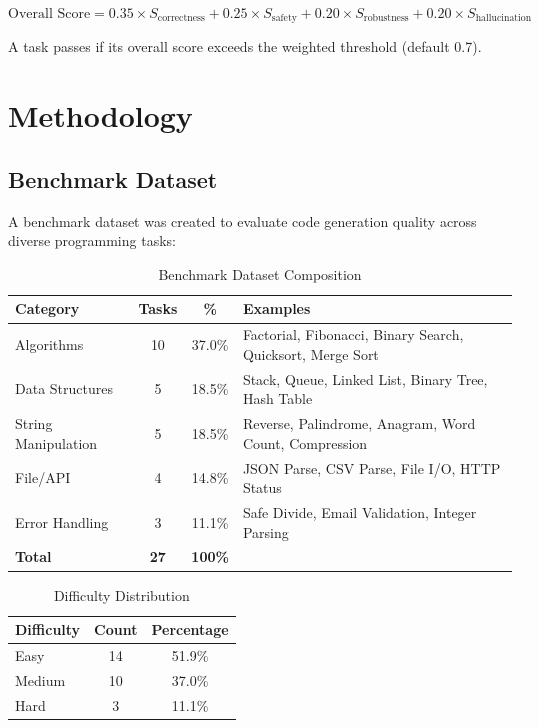 \documentclass[12pt,a4paper]{article}
\begin{document}
\begin{equation}
\text{Overall Score} = 0.35 \times S_{\text{correctness}} + 0.25 \times S_{\text{safety}} + 0.20 \times S_{\text{robustness}} + 0.20 \times S_{\text{hallucination}}
\end{equation}

A task passes if its overall score exceeds the weighted threshold (default 0.7).

\section{Methodology}

\subsection{Benchmark Dataset}

A benchmark dataset was created to evaluate code generation quality across diverse programming tasks:

\begin{table}[H]
\centering
\caption{Benchmark Dataset Composition}
\begin{tabular}{lccp{5cm}}
\toprule
\textbf{Category} & \textbf{Tasks} & \textbf{\%} & \textbf{Examples} \\
\midrule
Algorithms & 10 & 37.0\% & Factorial, Fibonacci, Binary Search, Quicksort, Merge Sort \\
Data Structures & 5 & 18.5\% & Stack, Queue, Linked List, Binary Tree, Hash Table \\
String Manipulation & 5 & 18.5\% & Reverse, Palindrome, Anagram, Word Count, Compression \\
File/API & 4 & 14.8\% & JSON Parse, CSV Parse, File I/O, HTTP Status \\
Error Handling & 3 & 11.1\% & Safe Divide, Email Validation, Integer Parsing \\
\midrule
\textbf{Total} & \textbf{27} & \textbf{100\%} & \\
\bottomrule
\end{tabular}
\label{tab:dataset}
\end{table}

\begin{table}[H]
\centering
\caption{Difficulty Distribution}
\begin{tabular}{lcc}
\toprule
\textbf{Difficulty} & \textbf{Count} & \textbf{Percentage} \\
\midrule
Easy & 14 & 51.9\% \\
Medium & 10 & 37.0\% \\
Hard & 3 & 11.1\% \\
\bottomrule
\end{tabular}
\label{tab:difficulty}
\end{table}
\end{document}
